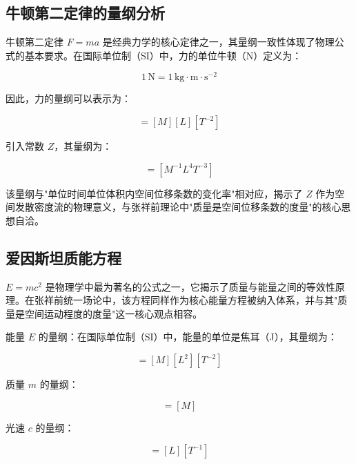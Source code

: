 \documentclass[12pt,a4paper]{article}
\begin{document}
\subsection{牛顿第二定律的量纲分析}
\label{subsection:newton_second_law_dimension}

牛顿第二定律 $F = m a$ 是经典力学的核心定律之一，其量纲一致性体现了物理公式的基本要求。在国际单位制（SI）中，力的单位牛顿（N）定义为：

\begin{equation}
1 \, \text{N} = 1 \, \text{kg} \cdot \text{m} \cdot \text{s}^{-2}
\label{eq:newton_definition}
\end{equation}

因此，力的量纲可以表示为：

\begin{equation}
[F] = [M] [L] [T^{-2}]
\label{eq:force_dimension}
\end{equation}

引入常数 $Z$，其量纲为：

\begin{equation}
[Z] = [M^{-1} L^4 T^{-3}]
\label{eq:z_dimension}
\end{equation}

该量纲与"单位时间单位体积内空间位移条数的变化率"相对应，揭示了 $Z$ 作为空间发散密度流的物理意义，与张祥前理论中"质量是空间位移条数的度量"的核心思想自洽。

\subsection{爱因斯坦质能方程}
\label{subsection:einstein_energy_mass}

$E = m c^2$ 是物理学中最为著名的公式之一，它揭示了质量与能量之间的等效性原理。在张祥前统一场论中，该方程同样作为核心能量方程被纳入体系，并与其"质量是空间运动程度的度量"这一核心观点相容。

能量 $E$ 的量纲：在国际单位制（SI）中，能量的单位是焦耳（J），其量纲为：

\begin{equation}
[E] = [M][L^2][T^{-2}]
\label{eq:energy_dimension}
\end{equation}

质量 $m$ 的量纲：

\begin{equation}
[m] = [M]
\label{eq:mass_dimension}
\end{equation}

光速 $c$ 的量纲：

\begin{equation}
[c] = [L][T^{-1}]
\label{eq:light_speed_dimension}
\end{equation}
\end{document}
